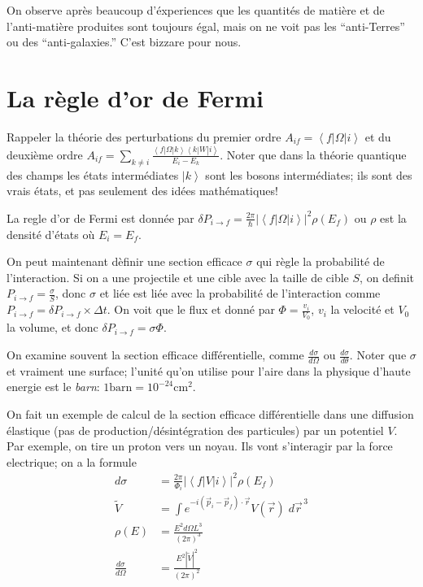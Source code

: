 \documentclass[10pt]{report}
\newcommand{\bra}[1]{\left<#1\right|}
\newcommand{\ket}[1]{\left|#1\right>}
\newcommand{\rd}[2]{\frac{d#1}{d#2}}
\newcommand{\abs}[1]{\left|#1\right|}
\begin{document}
On observe apr\`es beaucoup d'\'experiences que les quantit\'es de mati\`ere et de l'anti-mati\`ere produites sont toujours \'egal, mais on ne voit pas les ``anti-Terres'' ou des ``anti-galaxies.'' C'est bizzare pour nous.

\section{La r\`egle d'or de Fermi}

Rappeler la th\'eorie des perturbations du premier ordre $A_{if} = \bra{f}\Omega\ket{i}$ et du deuxi\`eme ordre $A_{if} = \sum\limits_{k \neq i}^{}\frac{\bra{f}\Omega\ket{k}\bra{k}W\ket{i}}{E_i - E_k}$. Noter que dans la th\'eorie quantique des champs les \'etats interm\'ediates $\ket{k}$ sont les bosons interm\'ediates; ils sont des vrais \'etats, et pas seulement des id\'ees math\'ematiques!

La regle d'or de Fermi est donn\'ee par $\delta P_{i \to f} = \frac{2\pi}{\hbar}\abs{\bra{f}\Omega\ket{i}}^2 \rho\left( E_f \right)$ ou $\rho$ est la densit\'e d'\'etats o\`u $E_i = E_f$.

On peut maintenant d\`efinir une section efficace $\sigma$ qui r\`egle la probabilit\'e de l'interaction. Si on a une projectile et une cible avec la taille de cible $S$, on definit $P_{i \to f} = \frac{\sigma}{S}$, donc $\sigma$ et li\'ee est li\'ee avec la probabilit\'e de l'interaction comme $P_{i \to f} = \delta P_{i \to f} \times \Delta t$. On voit que le flux et donn\'e par $\Phi = \frac{v_i}{V_0}$, $v_i$ la velocit\'e et $V_0$ la volume, et donc $\delta P_{i \to f} = \sigma \Phi$. 

On examine souvent la section efficace diff\'erentielle, comme $\rd{\sigma}{\Omega}$ ou $\rd{\sigma}{\theta}$. Noter que $\sigma$ et vraiment une surface; l'unit\'e qu'on utilise pour l'aire dans la physique d'haute energie est le \emph{barn}: $1 \mathrm{barn} = 10^{-24}\mathrm{cm^2}$. 

On fait un exemple de calcul de la section efficace diff\'erentielle dans une diffusion \'elastique (pas de production/d\'esint\'egration des particules) par un potentiel $V$. Par exemple, on tire un proton vers un noyau. Ils vont s'interagir par la force electrique; on a la formule
\begin{align}
    d\sigma &= \frac{2\pi}{\Phi_i}\abs{\bra{f}V\ket{i}}^2\rho(E_f)\\
    \tilde{V} &= \int e^{-i\left( \vec{p}_i - \vec{p}_f \right)\cdot \vec{r}}V(\vec{r})\; d\vec{r}^{\,3}\\
    \rho(E) &= \frac{E^2d\Omega L^3}{\left( 2\pi \right)^3}\\
    \rd{\sigma}{\Omega} &= \frac{E^2 \abs{\tilde{V}}^2}{\left( 2\pi \right)^2}
\end{align}
\end{document}

